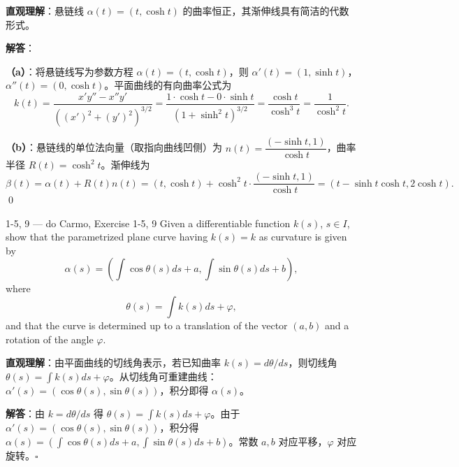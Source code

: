 \begin{solution}
\textbf{直观理解}：悬链线 $\alpha(t) = (t, \cosh t)$ 的曲率恒正，其渐伸线具有简洁的代数形式。

\textbf{解答}：

\textbf{（a）}：将悬链线写为参数方程 $\alpha(t) = (t, \cosh t)$，则 $\alpha'(t) = (1, \sinh t)$，$\alpha''(t) = (0, \cosh t)$。平面曲线的有向曲率公式为
\[
k(t) = \frac{x'y'' - x''y'}{((x')^2 + (y')^2)^{3/2}} = \frac{1\cdot\cosh t - 0\cdot\sinh t}{(1 + \sinh^2 t)^{3/2}} = \frac{\cosh t}{\cosh^3 t} = \frac{1}{\cosh^2 t}.
\]

\textbf{（b）}：悬链线的单位法向量（取指向曲线凹侧）为 $n(t) = \dfrac{(-\sinh t, 1)}{\cosh t}$，曲率半径 $R(t) = \cosh^2 t$。渐伸线为
\[
\beta(t) = \alpha(t) + R(t)n(t) = (t, \cosh t) + \cosh^2 t\cdot\frac{(-\sinh t, 1)}{\cosh t} = (t - \sinh t\cosh t, 2\cosh t).
\]
\qed
\end{solution}


\begin{exercise}{1-5, 9 — do Carmo, Exercise 1-5, 9}
Given a differentiable function $k(s)$, $s \in I$, show that the parametrized plane curve having $k(s) = k$ as curvature is given by
\[
\alpha(s) = \left(\int \cos\theta(s) ds + a, \int \sin\theta(s) ds + b\right),
\]
where
\[
\theta(s) = \int k(s) ds + \varphi,
\]
and that the curve is determined up to a translation of the vector $(a, b)$ and a rotation of the angle $\varphi$.
\end{exercise}

\begin{solution}
\textbf{直观理解}：由平面曲线的切线角表示，若已知曲率 $k(s) = d\theta/ds$，则切线角 $\theta(s) = \int k(s)ds + \varphi$。从切线角可重建曲线：$\alpha'(s) = (\cos\theta(s), \sin\theta(s))$，积分即得 $\alpha(s)$。

\textbf{解答}：由 $k = d\theta/ds$ 得 $\theta(s) = \int k(s)ds + \varphi$。由于 $\alpha'(s) = (\cos\theta(s), \sin\theta(s))$，积分得 $\alpha(s) = (\int\cos\theta(s)ds + a, \int\sin\theta(s)ds + b)$。常数 $a,b$ 对应平移，$\varphi$ 对应旋转。$\square$
\end{solution}

